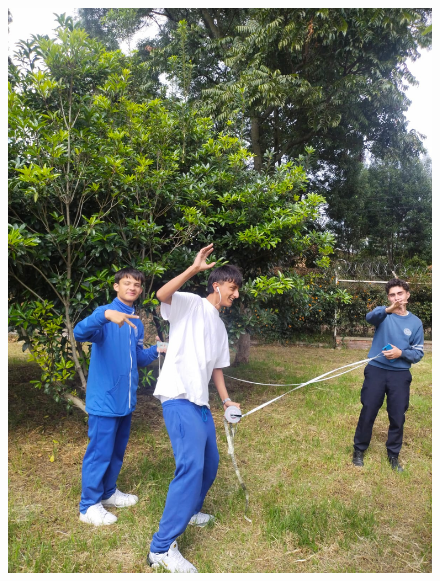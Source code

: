 \documentclass[17pt, t, lualatex]{beamer}
\begin{document}
\begin{frame}
\begin{columns}
  \begin{column}{.5\textwidth}
\begin{figure}
    \centering
    \includegraphics[height=0.8\textheight]{img/Mapeo2.jpg}
  \end{figure}
  \end{column}
\end{columns}


\end{frame}
\end{document}
